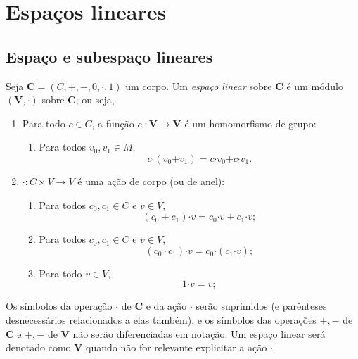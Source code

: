\chapter{Espaços lineares}

\section{Espaço e subespaço lineares}

\begin{definition}
Seja $\bm C=(C,+,-,0,\cdot,1)$ um corpo. Um \emph{espaço linear} sobre $\bm C$ é um módulo $(\bm V,\bm \cdot)$ sobre $\bm C$; ou seja,
	\begin{enumerate}
	\item  Para todo $c \in C$, a função $c \bm \cdot \colon \bm V \to \bm V$ é um homomorfismo de grupo:
		\begin{enumerate}
		\item Para todos $v_0,v_1 \in M$,
			\begin{equation*}
			c \bm \cdot (v_0 \bm + v_1) = c \bm \cdot v_0 \bm + c \bm \cdot v_1.
			\end{equation*}
		\end{enumerate}
	\item $\bm \cdot \colon C \times V \to V$ é uma ação de corpo (ou de anel):
		\begin{enumerate}
		\item Para todos $c_0,c_1 \in C$ e $v \in V$,
			\begin{equation*}
			(c_0 + c_1) \bm \cdot v = c_0 \bm \cdot v + c_1 \bm \cdot v;
			\end{equation*}
		\item Para todos $c_0,c_1 \in C$ e $v \in V$,
			\begin{equation*}
			(c_0 \cdot c_1) \bm \cdot v = c_0 \bm \cdot (c_1 \bm \cdot v);
			\end{equation*}
		\item Para todo $v \in V$,
			\begin{equation*}
			1 \bm \cdot v = v;
			\end{equation*}
		\end{enumerate}
	\end{enumerate}
Os símbolos da operação $\cdot$ de $\bm C$ e da ação $\bm \cdot$ serão suprimidos (e parênteses desnecessários relacionados a elas também), e os símbolos das operações $+,-$ de $\bm C$ e $\bm +,\bm -$ de $\bm V$ não serão diferenciadas em notação.
Um espaço linear será denotado como $\bm V$ quando não for relevante explicitar a ação $\bm \cdot$.
\end{definition}

